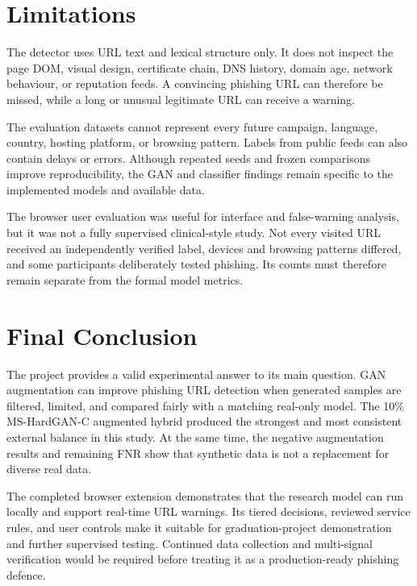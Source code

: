 \section{Limitations}

The detector uses URL text and lexical structure only. It does not inspect the
page DOM, visual design, certificate chain, DNS history, domain age, network
behaviour, or reputation feeds. A convincing phishing URL can therefore be
missed, while a long or unusual legitimate URL can receive a warning.

The evaluation datasets cannot represent every future campaign, language,
country, hosting platform, or browsing pattern. Labels from public feeds can
also contain delays or errors. Although repeated seeds and frozen comparisons
improve reproducibility, the GAN and classifier findings remain specific to
the implemented models and available data.

The browser user evaluation was useful for interface and false-warning
analysis, but it was not a fully supervised clinical-style study. Not every
visited URL received an independently verified label, devices and browsing
patterns differed, and some participants deliberately tested phishing. Its
counts must therefore remain separate from the formal model metrics.

\section{Final Conclusion}

The project provides a valid experimental answer to its main question. GAN
augmentation can improve phishing URL detection when generated samples are
filtered, limited, and compared fairly with a matching real-only model. The
10\% MS-HardGAN-C augmented hybrid produced the strongest and most consistent
external balance in this study. At the same time, the negative augmentation
results and remaining FNR show that synthetic data is not a replacement for
diverse real data.

The completed browser extension demonstrates that the research model can run
locally and support real-time URL warnings. Its tiered decisions, reviewed
service rules, and user controls make it suitable for graduation-project
demonstration and further supervised testing. Continued data collection and
multi-signal verification would be required before treating it as a
production-ready phishing defence.
